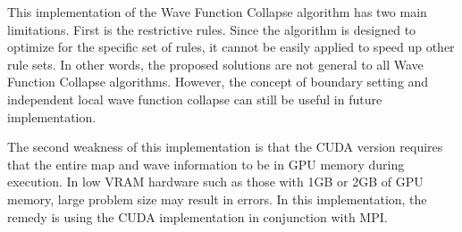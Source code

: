 
This implementation of the Wave Function Collapse algorithm has two main limitations. First is the restrictive rules. Since the algorithm is designed to optimize for the specific set of rules, it cannot be easily applied to speed up other rule sets. In other words, the proposed solutions are not general to all Wave Function Collapse algorithms. However, the concept of boundary setting and independent local wave function collapse can still be useful in future implementation. 

The second weakness of this implementation is that the CUDA version requires that the entire map and wave information to be in GPU memory during execution. In low VRAM hardware such as those with 1GB or 2GB of GPU memory, large problem size may result in errors. In this implementation, the remedy is using the CUDA implementation in conjunction with MPI.